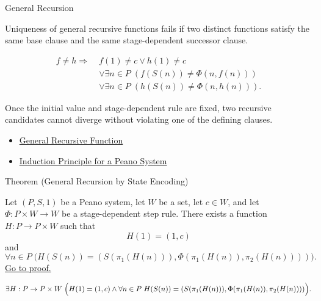 \begin{topicbox}{General Recursion}
\begin{remark*}
Uniqueness of general recursive functions fails if two distinct functions
satisfy the same base clause and the same stage-dependent successor clause.
\end{remark*}

\begin{remark*}
\[
\begin{aligned}
f\neq h
\Longrightarrow\;&
f(1)\neq c\lor h(1)\neq c\\
&\lor \exists n\in P\;(f(S(n))\neq \Phi(n,f(n)))\\
&\lor \exists n\in P\;(h(S(n))\neq \Phi(n,h(n))).
\end{aligned}
\]
\end{remark*}

\begin{remark*}[Interpretation]
Once the initial value and stage-dependent rule are fixed, two recursive
candidates cannot diverge without violating one of the defining clauses.
\end{remark*}

\begin{dependencies}
\begin{itemize}
  \item \hyperref[def:general-recursive-function]{General Recursive Function}
  \item \hyperref[thm:induction-principle-for-peano-system]{Induction Principle for a Peano System}
\end{itemize}
\end{dependencies}

\begin{theorembox}{Theorem (General Recursion by State Encoding)}
\begin{theorem}
\label{thm:general-recursion-by-state-encoding}
Let $(P,S,1)$ be a Peano system, let $W$ be a set, let $c\in W$, and let
$\Phi:P\times W\to W$ be a stage-dependent step rule. There exists a function
$H:P\to P\times W$ such that
\[
H(1)=(1,c)
\]
and
\[
\forall n\in P\;
\bigl(H(S(n))=(S(\pi_1(H(n))),\Phi(\pi_1(H(n)),\pi_2(H(n))))\bigr).
\]
\hyperref[prf:general-recursion-by-state-encoding]{Go to proof.}
\end{theorem}
\end{theorembox}

\begin{remark*}
\[
\exists H:P\to P\times W\;
\Bigl(H(1)=(1,c)\land
\forall n\in P\;
H(S(n))=(S(\pi_1(H(n))),\Phi(\pi_1(H(n)),\pi_2(H(n))))\Bigr).
\]
\end{remark*}


\end{topicbox}
